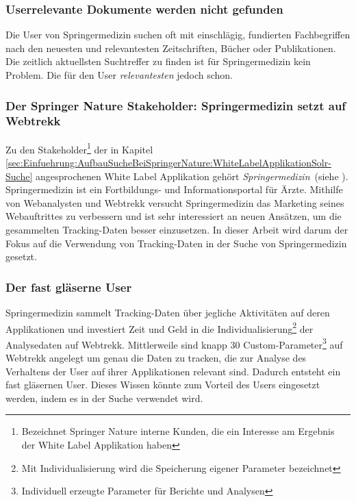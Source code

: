 \subsubsection{Userrelevante Dokumente werden nicht gefunden}
\label{sec:Einfuehrung:Problemstellung:Userrelevanz}

Die User von Springermedizin suchen oft mit einschlägig, fundierten Fachbegriffen nach den neuesten und relevantesten Zeitschriften, Bücher oder Publikationen. Die zeitlich aktuellsten Suchtreffer zu finden ist für Springermedizin kein Problem. Die für den User \textit{relevantesten} jedoch schon.

\subsubsection{Der Springer Nature Stakeholder: Springermedizin setzt auf Webtrekk}
\label{sec:Einfuehrung:Problemstellung:Springermedizin}

Zu den Stakeholder\footnote{Bezeichnet Springer Nature interne Kunden, die ein Interesse am Ergebnis der White Label Applikation haben} der in Kapitel \ref{sec:Einfuehrung:AufbauSucheBeiSpringerNature:WhiteLabelApplikationSolr-Suche} angesprochenen White Label Applikation gehört \textit{Springermedizin}~(siehe \cite{SMED}). Springermedizin ist ein Fortbildungs- und Informationsportal für Ärzte. Mithilfe von Webanalysten und Webtrekk versucht Springermedizin das Marketing seines Webauftrittes zu verbessern und ist sehr interessiert an neuen Ansätzen, um die gesammelten Tracking-Daten besser einzusetzen. In dieser Arbeit wird darum der Fokus auf die Verwendung von Tracking-Daten in der Suche von Springermedizin gesetzt. 
 

\subsubsection{Der fast gläserne User}
\label{sec:Einfuehrung:Problemstellung:Glaeserne-User}

Springermedizin sammelt Tracking-Daten über jegliche Aktivitäten auf deren Applikationen und investiert Zeit und Geld in die Individualisierung\footnote{Mit Individualisierung wird die Speicherung eigener Parameter bezeichnet} der Analysedaten auf Webtrekk. Mittlerweile sind knapp 30 Custom-Parameter\footnote{Individuell erzeugte Parameter für Berichte und Analysen} auf Webtrekk angelegt um genau die Daten zu tracken, die zur Analyse des Verhaltens der User auf ihrer Applikationen relevant sind. Dadurch entsteht ein fast \glqq gläsernen User\grqq{}. Dieses Wissen könnte zum Vorteil des Users eingesetzt werden, indem es in der Suche verwendet wird.

